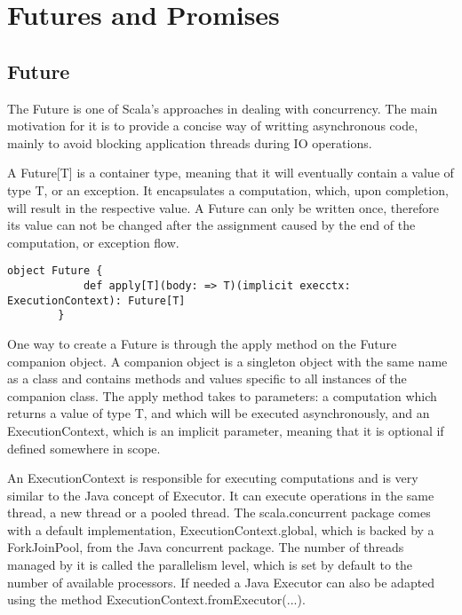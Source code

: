 \documentclass[12pt]{article}
\begin{document}
	\section{Futures and Promises}

	\subsection{Future}
	The Future is one of Scala's approaches in dealing with concurrency\cite{FuturePromiseScalaDocs}. 
	The main motivation for it is to provide a concise way of writting asynchronous code, mainly 
	to avoid blocking application threads during IO operations. 

	A Future[T] is a container type, meaning that it will eventually contain a value of type T, or an exception\cite{FuturePromiseNeophyte}.
	It encapsulates a computation, which, upon completion, will result in the respective value. A Future 
	can only be written once, therefore its value can not be changed after the assignment caused by the 
	end of the computation, or exception flow.

	\begin{lstlisting}[style=myScalastyle]
		object Future {
			def apply[T](body: => T)(implicit execctx: ExecutionContext): Future[T]
		}
	\end{lstlisting}

	One way to create a Future is through the apply method on the Future companion object.
	A companion object is a singleton object with the same name as a class and contains methods 
	and values specific to all instances of the companion class\cite{SingletonObj}. The apply method
	takes to parameters: a computation which returns a value of type T, and which will be executed 
	asynchronously, and an ExecutionContext, which is an implicit parameter, meaning that it is optional 
	if defined somewhere in scope. 

	An ExecutionContext is responsible for executing computations and is very similar to the 
	Java concept of Executor\cite{FuturePromiseScalaDocs}. It can execute operations in the same thread, a new thread or a 
	pooled thread. The scala.concurrent package comes with a default implementation, ExecutionContext.global, 
	which is backed by a ForkJoinPool, from the Java concurrent package. 
	The number of threads managed by it is called the parallelism level, which is set 
	by default to the number of available processors. If needed a Java Executor can also be adapted 
	using the method ExecutionContext.fromExecutor(...).
\end{document}

